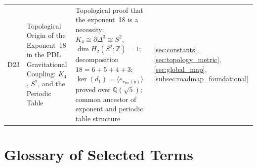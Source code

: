 \documentclass[11pt,a4paper]{article}
\begin{document}
\begin{longtable}{@{}p{0.9cm}L{5cm}L{6.5cm}L{2.4cm}@{}}
D23 &
  Topological Origin of the Exponent~18 in the PDL Gravitational Coupling: $K_4$, $S^2$, and the Periodic Table &
  Topological proof that the exponent~18 is a necessity: $K_4 \cong \partial\Delta^3 \cong S^2$, $\dim H_2(S^2;\mathbb{Z})=1$; decomposition $18=6+5+4+3$; $\ker(d_1) = \langle e_{r_{\mathrm{val}}(p)}\rangle$ proved over $\mathbb{Q}(\sqrt{5})$; common ancestor of exponent and periodic table structure &
  \ref{sec:constants}, \ref{sec:topology_metric}, \ref{sec:global_map}, \ref{subsec:roadmap_foundational} \\[0.4em]

\end{longtable}

\section{Glossary of Selected Terms}
\label{app:glossary}
\end{document}
